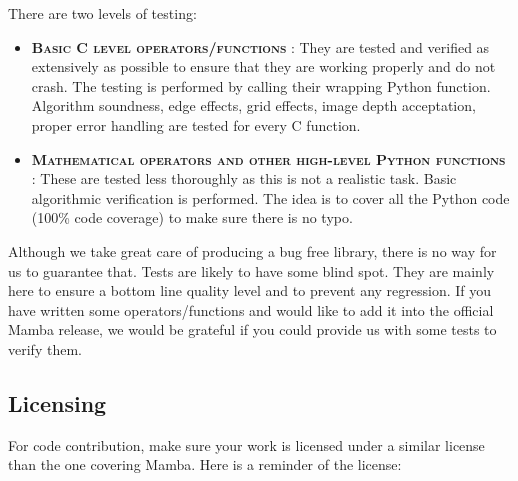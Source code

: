 \documentclass[a4paper,10pt,oneside]{article}
\begin{document}
There are two levels of testing:

\begin{itemize}
\item \textbf{\textsc{Basic C level operators/functions}} :
They are tested and verified as extensively as possible to ensure that they
are working properly and do not crash. The testing is performed by calling their
wrapping Python function. Algorithm soundness, edge effects,
grid effects, image depth acceptation, proper error handling are tested for every
C function.
\item \textbf{\textsc{Mathematical operators and other high-level Python functions}} :
These are tested less thoroughly as this is not a realistic task. Basic
algorithmic verification is performed. The idea is to cover all the Python code
(100\% code coverage) to make sure there is no typo.
\end{itemize}

Although we take great care of producing a bug free library, there is no way
for us to guarantee that. Tests are likely to have some blind spot. They are
mainly here to ensure a bottom line quality level and to prevent any regression.
If you have written some operators/functions and would like to add it into the
official Mamba release, we would be grateful if you could provide us with some
tests to verify them.

\subsection{Licensing}

\label{cha:Licensing}

For code contribution, make sure your work is licensed under a similar
license than the one covering Mamba. Here is a reminder of the license:

\vspace{0.5cm}
\end{document}
